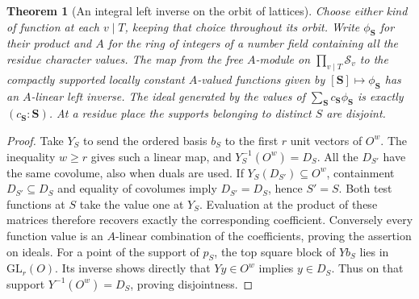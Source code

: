 \documentclass[a4paper,11pt]{article}
\newtheorem{theorem}[proposition]{Theorem}
\theoremstyle{definition}
\theoremstyle{remark}
\numberwithin{equation}{section}
\begin{document}
\begin{theorem}[An integral left inverse on the orbit of lattices]
\label{thm:eval161}
Choose either kind of function at each \(v\mid T\), keeping
that choice throughout its orbit. Write \(\phi_{\boldsymbol S}\)
for their product and \(A\) for the ring of integers of a
number field containing all the residue character values.
The map from the free \(A\)-module on \(\prod_{v\mid T}\mathcal S_v\)
to the compactly supported locally constant \(A\)-valued functions
given by \([\boldsymbol S]\mapsto\phi_{\boldsymbol S}\) has an
\(A\)-linear left inverse. The ideal generated by the values
of \(\sum_{\boldsymbol S}c_{\boldsymbol S}\phi_{\boldsymbol S}\)
is exactly \((c_{\boldsymbol S}:\boldsymbol S)\). At a residue
place the supports belonging to distinct \(S\) are disjoint.
\end{theorem}
\begin{proof}
Take \(Y_S\) to send the ordered basis \(b_S\) to the first
\(r\) unit vectors of \(O^w\). The inequality \(w\ge r\)
gives such a linear map, and \(Y_S^{-1}(O^w)=D_S\).
All the \(D_{S'}\) have the same covolume, also when duals
are used. If \(Y_S(D_{S'})\subseteq O^w\), containment
\(D_{S'}\subseteq D_S\) and equality of covolumes imply
\(D_{S'}=D_S\), hence \(S'=S\). Both test functions at \(S\)
take the value one at \(Y_S\). Evaluation at the product
of these matrices therefore recovers exactly the corresponding
coefficient. Conversely every function value is an \(A\)-linear
combination of the coefficients, proving the assertion on ideals.
For a point of the support of \(p_S\), the top square block of
\(Yb_S\) lies in \(\mathrm{GL}_r(O)\). Its inverse shows directly
that \(Yy\in O^w\) implies \(y\in D_S\). Thus on that support
\(Y^{-1}(O^w)=D_S\), proving disjointness.
\end{proof}
\end{document}
